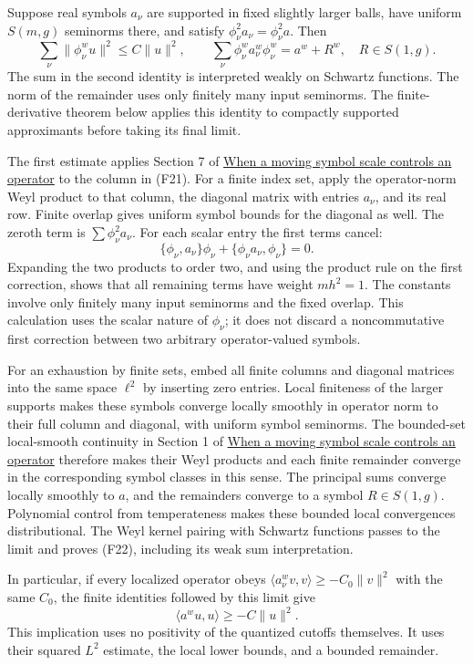 \documentclass[
  11pt,
]{article}
\begin{document}
Suppose real symbols \(a_\nu\) are supported in fixed slightly larger
balls, have uniform \(S(m,g)\) seminorms there, and satisfy
\(\phi_\nu^2a_\nu=\phi_\nu^2a\). Then \[
\sum_\nu\|\phi_\nu^wu\|^2\leq C\|u\|^2,
\qquad
\sum_\nu\phi_\nu^wa_\nu^w\phi_\nu^w=a^w+R^w,
\quad R\in S(1,g).
\tag{F22}
\] The sum in the second identity is interpreted weakly on Schwartz
functions. The norm of the remainder uses only finitely many input
seminorms. The finite-derivative theorem below applies this identity to
compactly supported approximants before taking its final limit.

The first estimate applies Section 7 of
\href{metric-operator-bounds.pdf}{When a moving symbol scale controls an
operator} to the column in (F21). For a finite index set, apply the
operator-norm Weyl product to that column, the diagonal matrix with
entries \(a_\nu\), and its real row. Finite overlap gives uniform symbol
bounds for the diagonal as well. The zeroth term is
\(\sum\phi_\nu^2a_\nu\). For each scalar entry the first terms cancel:
\[
\{\phi_\nu,a_\nu\}\phi_\nu+
                  \{\phi_\nu a_\nu,\phi_\nu\}=0.
\tag{F23}
\] Expanding the two products to order two, and using the product rule
on the first correction, shows that all remaining terms have weight
\(mh^2=1\). The constants involve only finitely many input seminorms and
the fixed overlap. This calculation uses the scalar nature of
\(\phi_\nu\); it does not discard a noncommutative first correction
between two arbitrary operator-valued symbols.

For an exhaustion by finite sets, embed all finite columns and diagonal
matrices into the same space \(\ell^2\) by inserting zero entries. Local
finiteness of the larger supports makes these symbols converge locally
smoothly in operator norm to their full column and diagonal, with
uniform symbol seminorms. The bounded-set local-smooth continuity in
Section 1 of \href{metric-operator-bounds.pdf}{When a moving symbol scale
controls an operator} therefore makes their Weyl products and each
finite remainder converge in the corresponding symbol classes in this
sense. The principal sums converge locally smoothly to \(a\), and the
remainders converge to a symbol \(R\in S(1,g)\). Polynomial control from
temperateness makes these bounded local convergences distributional. The
Weyl kernel pairing with Schwartz functions passes to the limit and
proves (F22), including its weak sum interpretation.

In particular, if every localized operator obeys
\(\langle a_\nu^wv,v\rangle\geq-C_0\|v\|^2\) with the same \(C_0\), the
finite identities followed by this limit give \[
\langle a^wu,u\rangle\geq-C\|u\|^2.
\tag{F24}
\] This implication uses no positivity of the quantized cutoffs
themselves. It uses their squared \(L^2\) estimate, the local lower
bounds, and a bounded remainder.
\end{document}
